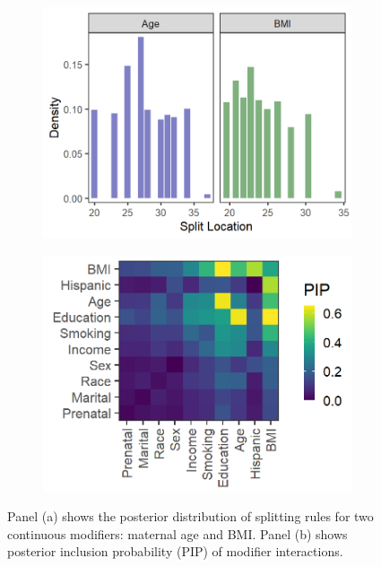 \documentclass[12pt]{article}
\begin{document}
\begin{figure}
    \centering
    \begin{subfigure}{.46\textwidth}
        \includegraphics[width=.95\textwidth]{img/bwgaz_cont_split.png}
        \caption{}
        \label{fig:pip-cont}
    \end{subfigure}
    \begin{subfigure}{.45\textwidth}
        \includegraphics[width=.95\textwidth]{img/bwgaz_pip_int.png}
        \caption{}
        \label{fig:pip-int}
    \end{subfigure}
    \caption{Panel (a) shows the posterior distribution of splitting rules for two continuous modifiers: maternal age and BMI. Panel (b) shows posterior inclusion probability (PIP) of modifier interactions.}
    \label{fig:pip}
\end{figure}
\end{document}
